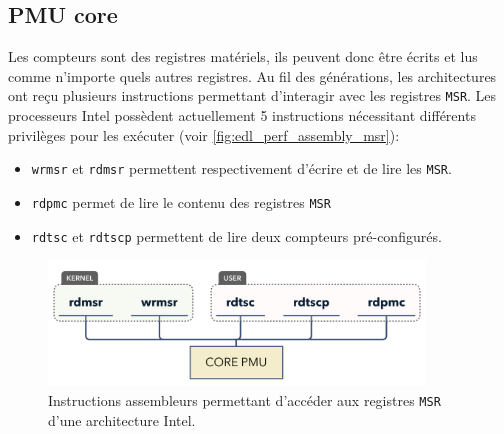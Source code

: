     \subsection{PMU core} \label{sec:perf_asm_msr}

        
        Les compteurs sont des registres matériels, ils peuvent donc être écrits et lus comme n'importe quels autres registres. Au fil des générations, les architectures ont reçu plusieurs instructions permettant d'interagir avec les registres \verb|MSR|. Les processeurs Intel possèdent actuellement 5 instructions nécessitant différents privilèges pour les exécuter (voir \autoref{fig:edl_perf_assembly_msr}):
        \begin{itemize}
            \item \verb|wrmsr| et \verb|rdmsr| permettent respectivement d'écrire et de lire les \verb|MSR|.
            \item  \verb|rdpmc| permet de lire le contenu des registres \verb|MSR|
            \item \verb|rdtsc| et \verb|rdtscp| permettent de lire deux compteurs pré-configurés.
        \end{itemize}
        
         
        \begin{figure}[ht!]
            \center
            \includegraphics[width=10cm]{images/edl_perf_assembly_msr.png}
            \caption{\label{fig:edl_perf_assembly_msr} Instructions assembleurs permettant d'accéder aux registres \texttt{MSR} d'une architecture Intel.}
        \end{figure}
        
